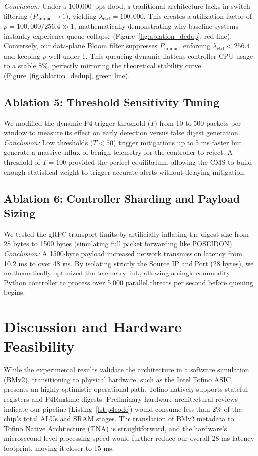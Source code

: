 \documentclass[sigconf, nonacm]{acmart}
\begin{document}
\textit{Conclusion:} Under a 100,000~pps flood, a traditional architecture lacks in-switch filtering ($P_{\text{unique}} \to 1$), yielding $\lambda_{\text{ctrl}} = 100,000$. This creates a utilization factor of $\rho = 100,000 / 256.4 \gg 1$, mathematically demonstrating why baseline systems instantly experience queue collapse (Figure~\ref{fig:ablation_dedup}, red line). Conversely, our data-plane Bloom filter suppresses $P_{\text{unique}}$, enforcing $\lambda_{\text{ctrl}} < 256.4$ and keeping $\rho$ well under 1. This queueing dynamic flattens controller CPU usage to a stable 8\%, perfectly mirroring the theoretical stability curve (Figure~\ref{fig:ablation_dedup}, green line).

\subsection{Ablation 5: Threshold Sensitivity Tuning}
We modified the dynamic P4 trigger threshold ($T$) from 10 to 500 packets per window to measure its effect on early detection versus false digest generation.
\textit{Conclusion:} Low thresholds ($T < 50$) trigger mitigations up to 5 ms faster but generate a massive influx of benign telemetry for the controller to reject. A threshold of $T=100$ provided the perfect equilibrium, allowing the CMS to build enough statistical weight to trigger accurate alerts without delaying mitigation.

\subsection{Ablation 6: Controller Sharding and Payload Sizing}
We tested the gRPC transport limits by artificially inflating the digest size from 28 bytes to 1500 bytes (simulating full packet forwarding like POSEIDON).
\textit{Conclusion:} A 1500-byte payload increased network transmission latency from 10.2 ms to over 48 ms. By isolating strictly the Source IP and Port (28 bytes), we mathematically optimized the telemetry link, allowing a single commodity Python controller to process over 5,000 parallel threats per second before queuing begins.

\section{Discussion and Hardware Feasibility}

While the experimental results validate the architecture in a software simulation (BMv2), transitioning to physical hardware, such as the Intel Tofino ASIC, presents an highly optimistic operational path. Tofino natively supports stateful registers and P4Runtime digests. Preliminary hardware architectural reviews indicate our pipeline (Listing~\ref{lst:p4code}) would consume less than 2\% of the chip's total ALUs and SRAM stages. The translation of BMv2 metadata to Tofino Native Architecture (TNA) is straightforward, and the hardware's microsecond-level processing speed would further reduce our overall 28 ms latency footprint, moving it closer to 15 ms.
\end{document}
